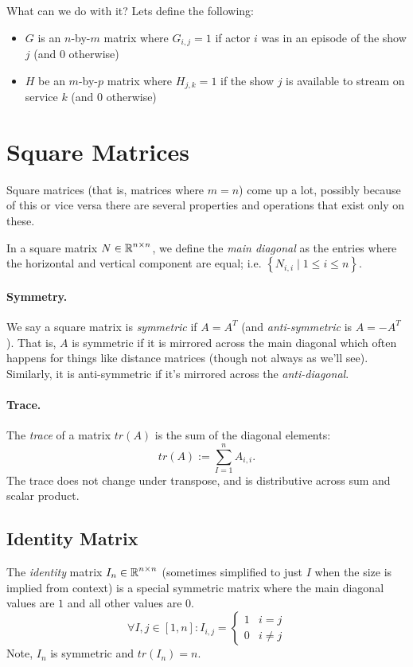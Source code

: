 What can we do with it? Lets define the following:
\begin{itemize}
\item $G$ is an $n$-by-$m$ matrix where $G_{i,j}=1$ if actor $i$ was in an episode of the show $j$ (and $0$ otherwise)
\item $H$ be an $m$-by-$p$ matrix where $H_{j,k}=1$ if the show $j$ is available to stream on service $k$ (and $0$ otherwise) 
\end{itemize}


\section{Square Matrices}
Square matrices (that is, matrices where $m=n$) come up a lot, 
possibly because of this or vice versa there are several properties and operations that exist only on these. 

In a square matrix $N\in\operatorname{\mathbb{R}}^{n\times n}$, we define the \emph{main diagonal} as the entries where the horizontal and vertical component are equal; 
i.e. $\left\{N_{i,i} \mid 1 \le i \le n\right\}$. 

\paragraph{Symmetry.}
We say a square matrix is \emph{symmetric} if $A=A^T$
(and \textit{anti-symmetric} is $A = -A^T$). 
That is, $A$ is symmetric if it is mirrored across the main diagonal which often happens for things like distance matrices (though not always as we'll see). 
Similarly, it is anti-symmetric if it's mirrored across the \textit{anti-diagonal}.

\paragraph{Trace. }
The \emph{trace} of a matrix $tr(A)$ is the sum of the diagonal elements: \[tr(A) := \sum_{I=1}^n A_{i,i}.\] 
The trace does not change under transpose, and is distributive across sum and scalar product. 

\subsection{Identity Matrix}

The \emph{identity} matrix $I_n \in\operatorname{\mathbb{R}}^{n\times n}$ (sometimes simplified to just $I$ when the size is implied from context) 
is a special symmetric matrix where the main diagonal values are $1$ and all other values are $0$.
\[
\forall I,j \in [1,n]: I_{i,j} = \begin{cases} 1 & i=j\\ 0 & i\ne j\end{cases}
\]
Note, $I_n$ is symmetric and $tr(I_n)=n$.

